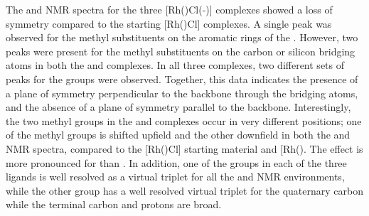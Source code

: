 The \proton{} and \carbon{} NMR spectra for the three [Rh(\tBuxantphos)Cl(-)] complexes showed a loss of symmetry compared to the starting [Rh(\tBuxantphos)Cl] complexes.  A single peak was observed for the methyl substituents on the aromatic rings of the \tButhixantphos{}.  However, two peaks were present for the methyl substituents on the carbon or silicon bridging atoms in both the \tBuxantphos{} and \tBusixantphos{} complexes.  In all three complexes, two different sets of peaks for the \tBu{} groups were observed.  Together, this data indicates the presence of a plane of symmetry perpendicular to the backbone through the bridging atoms, and the absence of a plane of symmetry parallel to the backbone.  Interestingly, the two methyl groups in the \tBusixantphos{} and \tBuxantphos{} complexes occur in very different positions; one of the methyl groups is shifted upfield and the other downfield in both the \proton{} and \carbon{} NMR spectra, compared to the [Rh(\tBuxantphosk)Cl] starting material and [Rh(\tBuxantphosk)\ce{Cl(H)2]}.  The effect is more pronounced for \tBuxantphos{} than \tBusixantphos{}.  In addition, one of the \tBu{} groups in each of the three \tBuxantphos{} ligands is well resolved as a virtual triplet for all the \proton{} and \carbon{} NMR environments, while the other \tBu{} group has a well resolved virtual triplet for the quaternary carbon while the terminal carbon and protons are broad.
%

